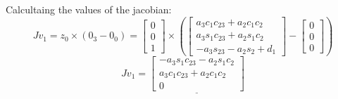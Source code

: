 \documentclass[12pt,norsk,a4paper]{article}
\begin{document}
    \newpage
    Calcultaing the values of the jacobian:\\
    \[Jv_1 = z_0\times(0_3-0_0) = \left[\begin{array}{c} 0 \\ 0 \\ 1\end{array}\right]\times\left(\left[\begin{array}{c}a_3c_1c_{23}+a_2c_1c_2 \\  a_3s_1c_{23}+a_2s_1c_2 \\ -a_3s_{23}-a_2s_2+d_1\end{array}\right]-\left[\begin{array}{c}0 \\ 0 \\ 0\end{array}\right]\right) \]
    \[Jv_1 = \underline{\left[\begin{array}{c}  -a_3s_1c_{23}-a_2s_1c_2 \\ a_3c_1c_{23}+a_2c_1c_2 \\ 0\end{array}\right]}\]
    \vspace{6mm}
\end{document}
